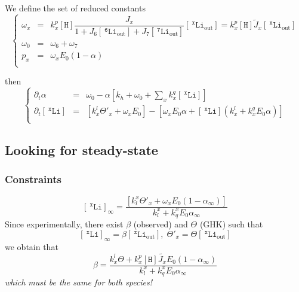 \documentclass[aps,onecolumn,12pt]{revtex4}
\newcommand{\mychem}[1]{\mathtt{#1}}
\newcommand{\myconc}[1]{\left\lbrack{#1}\right\rbrack}
\newcommand{\spLi}[1]{{~^{\mychem{#1}}\mychem{Li}}}
\newcommand{\Li}[1]{\myconc{\spLi{#1}}}
\newcommand{\spLiOut}[1]{{\spLi{#1}}_{\mathrm{out}}}
\newcommand{\LiOut}[1]{\myconc{\spLiOut{#1}}}
\newcommand{\spproton}{\mychem{H}}
\newcommand{\proton}{\myconc{\spproton}}
\begin{document}
We define the set of reduced constants
\begin{equation}
\left\lbrace
	\begin{array}{rcl}
	\omega_x & = &  k_x^p \proton \dfrac{J_x}{1+J_6\LiOut{6}+J_7\LiOut{7}} \LiOut{x} = k_x^p \proton \tilde{J}_x\LiOut{x}\\
	\omega_0 & = & \omega_6 + \omega_7\\
	p_x & = & \omega_x E_0 \left(1-\alpha\right)\\
	\end{array}
\right.
\end{equation}


then
\begin{equation}
\boxed{
\left\lbrace
	\begin{array}{rcl}
		\partial_t\alpha    & = & \omega_0 - \alpha\left\lbrack k_h+\omega_0+{\sum_x k_x^q \Li{x}} \right\rbrack\\
		\partial_t\Li{x} & = & \left\lbrack k_x^l\Theta'_x+\omega_x E_0\right\rbrack
		-\left\lbrack
			\omega_x E_0\alpha +  \Li{x}  \left(k_x^l+ k_x^q E_0\alpha\right)
		\right\rbrack\\
	\end{array}
\right.
}
\end{equation}

\subsection{Looking for steady-state}
\subsubsection{Constraints}
\begin{equation}
	\Li{x}_\infty = \dfrac{\left\lbrack k_l^x\Theta'_x+\omega_x E_0 \left(1-\alpha_\infty\right)\right\rbrack}{k_l^x+ k_q^x E_0\alpha_\infty}
\end{equation}
Since experimentally, there exist $\beta$ (observed) and $\Theta$ (GHK) such that
\begin{equation}
	\Li{x}_\infty=\beta\LiOut{x},\;\Theta'_x = \Theta \LiOut{x}
\end{equation}
we obtain that
\begin{equation}
		\beta = \dfrac{k_x^l\Theta + k_x^p \proton \tilde{J_x} E_0 (1-\alpha_\infty)}{k_l^x+ k_q^x E_0\alpha_\infty}
\end{equation}
\textit{which must be the same for both species!}
\end{document}
